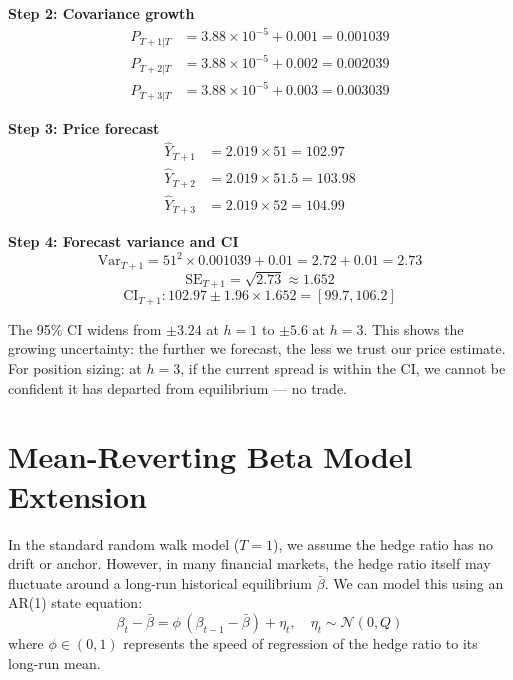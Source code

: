 \documentclass[10pt,a4paper,twocolumn]{article}
\begin{document}
\noindent\textbf{Step 2: Covariance growth}
\begin{align*}
  P_{T+1|T} &= 3.88\times10^{-5} + 0.001 = 0.001039\\
  P_{T+2|T} &= 3.88\times10^{-5} + 0.002 = 0.002039\\
  P_{T+3|T} &= 3.88\times10^{-5} + 0.003 = 0.003039
\end{align*}

\noindent\textbf{Step 3: Price forecast}
\begin{align*}
  \hat{Y}_{T+1} &= 2.019\times51    = 102.97\\
  \hat{Y}_{T+2} &= 2.019\times51.5  = 103.98\\
  \hat{Y}_{T+3} &= 2.019\times52    = 104.99
\end{align*}

\noindent\textbf{Step 4: Forecast variance and CI}
\[
  \mathrm{Var}_{T+1} = 51^2\times0.001039 + 0.01 = 2.72+0.01 = 2.73
\]
\[
  \mathrm{SE}_{T+1} = \sqrt{2.73} \approx 1.652
\]
\[
  \mathrm{CI}_{T+1}: 102.97 \pm 1.96\times1.652 = [99.7, 106.2]
\]

\begin{tcolorbox}[resultbox={Interpretation}]
The 95\% CI widens from $\pm3.24$ at $h=1$ to $\pm5.6$ at $h=3$.
This shows the growing uncertainty: the further we forecast, the less
we trust our price estimate.  For position sizing: at $h=3$, if the
current spread is within the CI, we cannot be confident it has departed
from equilibrium --- no trade.
\end{tcolorbox}

\section{Mean-Reverting Beta Model Extension}

In the standard random walk model ($T=1$), we assume the hedge ratio has no drift or anchor. However, in many financial markets, the hedge ratio itself may fluctuate around a long-run historical equilibrium $\bar{\beta}$. We can model this using an AR(1) state equation:
\begin{equation}
  \beta_t - \bar{\beta} = \phi\,(\beta_{t-1} - \bar{\beta}) + \eta_t, \quad \eta_t \sim \mathcal{N}(0, Q)
\end{equation}
where $\phi \in (0, 1)$ represents the speed of regression of the hedge ratio to its long-run mean.
\end{document}
